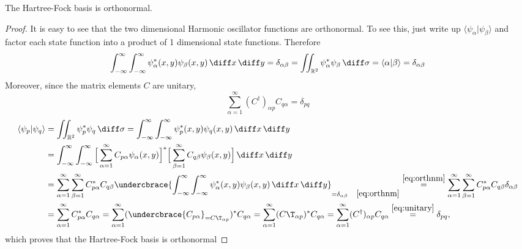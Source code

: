 \documentclass[11pt,english,a4paper]{article}
\begin{document}
\begin{prop}
The Hartree-Fock basis is orthonormal. \label{thm:hforth}
\end{prop}
\begin{proof}
It is easy to see that the two dimensional Harmonic oscillator functions are orthonormal. To see this, just write up $\langle \psi_{  \alpha} | \psi_{  \beta} \rangle$ and factor each state function into a product of 1 dimensional state functions. Therefore
\begin{equation}
\int_{- \infty}^\infty\int_{- \infty}^\infty \psi_\alpha^*(x,y)  \psi_\beta(x,y) \, \diff x \, \diff y = \delta_{  \alpha\beta} = \iint_{  \mathbb{R}^2} \psi_{  \alpha}^* \psi_{  \beta} \, \diff \sigma = \langle \alpha|\beta \rangle =\delta_{  \alpha \beta} \label{eq:orthnm}
\end{equation}
Moreover, since the matrix elements $C$ are unitary,
\begin{equation}
\sum_{\alpha=1}^\infty (C^\dagger)_{  \alpha p }C_{q\alpha} = \delta_{  pq} \label{eq:unitary}
\end{equation}
\begin{align*}
\langle \psi_{  p} | \psi_{  q} \rangle &= \iint_{  \mathbb{R}^2} \psi_{  p}^* \psi_{  q} \, \diff \sigma = \int_{- \infty}^\infty\int_{- \infty}^\infty \psi_{  p}^*(x,y) \psi_{  q}(x,y) \, \diff x \, \diff y \\
&= \int_{- \infty}^\infty\int_{- \infty}^\infty \Big[ \sum_{\alpha=1}^\infty C_{p\alpha} \psi_\alpha(x,y) \Big]^* \Big[ \sum_{\beta=1}^\infty C_{q\beta} \psi_\beta(x,y) \Big] \, \diff x \, \diff y \\
&= \sum_{\alpha=1}^\infty\sum_{\beta=1}^\infty C_{p\alpha}^*C_{q\beta}\undercbrace{\int_{- \infty}^\infty\int_{- \infty}^\infty \psi_\alpha^*(x,y)  \psi_\beta(x,y) \, \diff x \, \diff y}_{= \delta_{  \alpha\beta} \quad \eqref{eq:orthnm}}  \stackrel{\eqref{eq:orthnm}}{=} \sum_{\alpha=1}^\infty\sum_{\beta=1}^\infty C_{p\alpha}^*C_{q\beta}\delta_{  \alpha\beta} \\
&= \sum_{\alpha=1}^\infty C_{p\alpha}^*C_{q\alpha} 
= \sum_{\alpha=1}^\infty (\undercbrace{C_{p\alpha}}_{={C\T}_{\alpha p }})^*C_{q\alpha} = \sum_{\alpha=1}^\infty ({C\T}_{\alpha p })^*C_{q\alpha} = \sum_{\alpha=1}^\infty (C^\dagger)_{  \alpha p }C_{q\alpha} \stackrel{\eqref{eq:unitary}}{=} \delta_{  pq},
\end{align*}
which proves that the Hartree-Fock basis is orthonormal
\end{proof}
\end{document}
